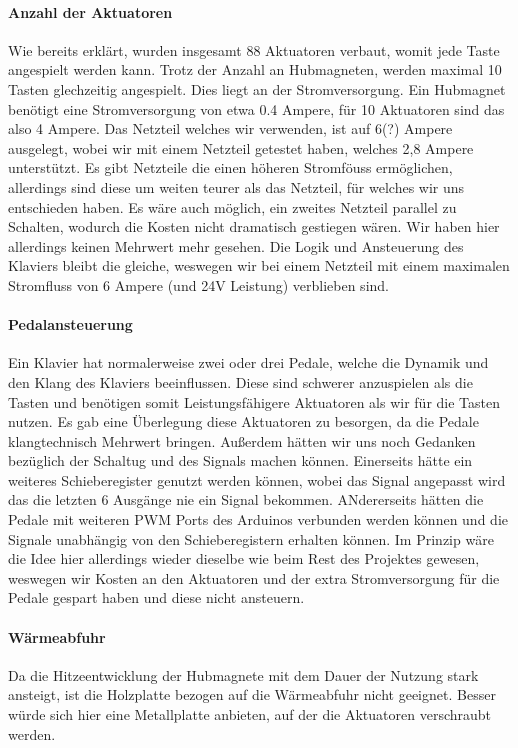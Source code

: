 \paragraph{Anzahl der Aktuatoren}
Wie bereits erklärt, wurden insgesamt 88 Aktuatoren verbaut, womit jede Taste angespielt werden kann. Trotz der Anzahl an
Hubmagneten, werden maximal 10 Tasten glechzeitig angespielt. Dies liegt an der Stromversorgung. Ein Hubmagnet benötigt
eine Stromversorgung von etwa 0.4 Ampere, für 10 Aktuatoren sind das also 4 Ampere. Das Netzteil welches wir verwenden, ist auf
6(?) Ampere ausgelegt, wobei wir mit einem Netzteil getestet haben, welches 2,8 Ampere unterstützt. Es gibt Netzteile die
einen höheren Stromföuss ermöglichen, allerdings sind diese um weiten teurer als das Netzteil, für welches wir uns entschieden haben.
Es wäre auch möglich, ein zweites Netzteil parallel zu Schalten, wodurch die Kosten nicht dramatisch gestiegen wären.
Wir haben hier allerdings keinen Mehrwert mehr gesehen. Die Logik und Ansteuerung des Klaviers bleibt die gleiche, weswegen
wir bei einem Netzteil mit einem maximalen Stromfluss von 6 Ampere (und 24V Leistung) verblieben sind.

\paragraph{Pedalansteuerung}
Ein Klavier hat normalerweise zwei oder drei Pedale, welche die Dynamik und den Klang des Klaviers beeinflussen.
Diese sind schwerer anzuspielen als die Tasten und benötigen somit Leistungsfähigere Aktuatoren als wir für die Tasten nutzen.
Es gab eine Überlegung diese Aktuatoren zu besorgen, da die Pedale klangtechnisch Mehrwert bringen.
Außerdem hätten wir uns noch Gedanken bezüglich der Schaltug und des Signals machen können.
Einerseits hätte ein weiteres Schieberegister genutzt werden können, wobei das Signal angepasst wird das die letzten 6 Ausgänge nie ein Signal bekommen.
ANdererseits hätten die Pedale mit weiteren \ac{PWM} Ports des Arduinos verbunden werden können und die Signale unabhängig von den
Schieberegistern erhalten können.
Im Prinzip wäre die Idee hier allerdings wieder dieselbe wie beim Rest des Projektes gewesen,
weswegen wir Kosten an den Aktuatoren und der extra Stromversorgung für die Pedale gespart haben und diese nicht ansteuern.

\paragraph{Wärmeabfuhr}
Da die Hitzeentwicklung der Hubmagnete mit dem Dauer der Nutzung stark ansteigt, ist die Holzplatte bezogen auf die Wärmeabfuhr nicht geeignet.
Besser würde sich hier eine Metallplatte anbieten, auf der die Aktuatoren verschraubt werden.


